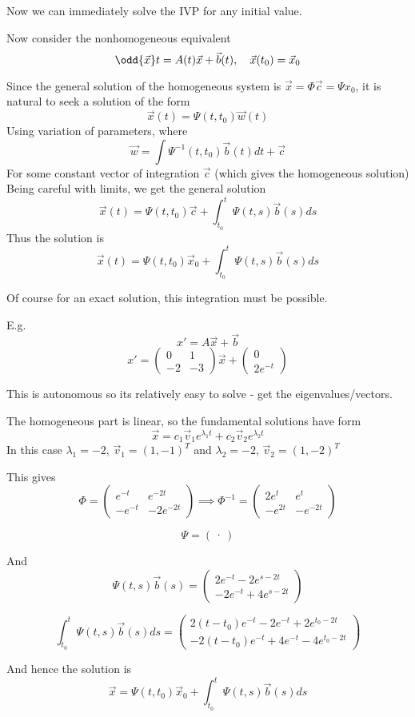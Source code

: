 \documentclass{X:/Documents/Coding/Latex/myassignment}
\begin{document}
Now we can immediately solve the IVP for any initial value.


Now consider the nonhomogeneous equivalent
\[\odd{\vec x}t = A(t)\vec x + \vec b(t), \quad \vec x(t_0) = \vec x_0\]

Since the general solution of the homogeneous system is $\vec x = \Phi \vec c = \Psi x_0$, it is natural to seek a solution of the form
\[\vec x(t) = \Psi(t,t_0) \vec w(t)\]
Using variation of parameters, where
\[\vec w = \int \Psi^{-1}(t,t_0) \vec b(t) dt + \vec c\]
For some constant vector of integration $\vec c$ (which gives the homogeneous solution)
Being careful with limits, we get the general solution
\[\vec x(t) = \Psi(t,t_0)\vec c + \int_{t_0}^t \Psi(t,s) \vec b(s) ds\]
Thus the solution is
\[\vec x(t) = \Psi(t,t_0)\vec x_0 + \int_{t_0}^t \Psi(t,s) \vec b(s) ds\]


Of course for an exact solution, this integration must be possible. 




E.g. 
\[x' = A\vec x + \vec b\]
\[x' = \begin{pmatrix}
    0&1\\-2&-3
\end{pmatrix} \vec x + \begin{pmatrix}
    0\\2e^{-t}
\end{pmatrix}\]

This is autonomous so its relatively easy to solve - get the eigenvalues/vectors. 

The homogeneous part is linear, so the fundamental solutions have form
\[\vec x = c_1\vec v_1 e^{\lambda_1 t} + c_2 \vec v_2 e^{\lambda_2 t}\]
In this case $\lambda_1 = -2$, $\vec v_1 = (1,-1)^T$ and $\lambda_2 = -2$, $\vec v_2 = (1,-2)^T$

This gives 
\[\Phi = \begin{pmatrix}
    e^{-t} & e^{-2t}\\-e^{-t} & -2e^{-2t}
\end{pmatrix} \implies \Phi^{-1} = \begin{pmatrix}
    2e^t & e^t\\ -e^{2t} & -e^{-2t}
\end{pmatrix}\]

\[\Psi = \begin{pmatrix}
    \cdot
\end{pmatrix}\]


And 
\[\Psi(t,s) \vec b(s) = \begin{pmatrix}
    2e^{-t} -2e^{s-2t}\\
    -2e^{-t} + 4e^{s-2t} 
\end{pmatrix}\]

\[\int_{t_0}^t \Psi(t,s) \vec b(s) ds = \begin{pmatrix}
    2(t-t_0)e^{-t} - 2e^{-t} + 2e^{t_0-2t}\\ 
    -2(t-t_0)e^{-t} + 4e^{-t} - 4e^{t_0-2t} 
\end{pmatrix}\]

And hence the solution is
\[\vec x = \Psi(t,t_0) \vec x_0 + \int_{t_0}^t \Psi(t,s) \vec b(s) ds\]
\end{document}
